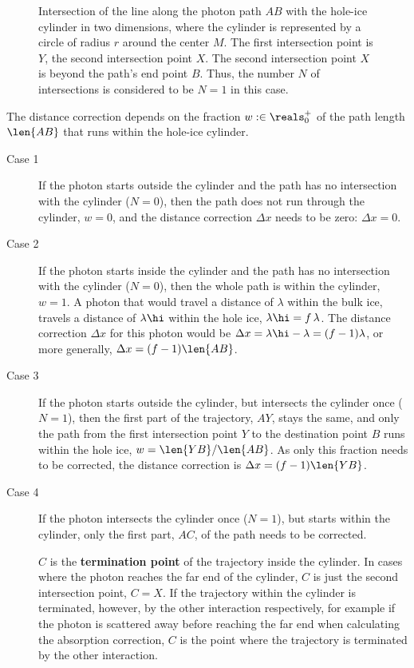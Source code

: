 \begin{figure}[htbp]
  \caption{Intersection of the line along the photon path $AB$ with the hole-ice cylinder in two dimensions, where the cylinder is represented by a circle of radius $r$ around the center $M$. The first intersection point is $Y$, the second intersection point $X$. The second intersection point $X$ is beyond the path's end point $B$. Thus, the number $N$ of intersections is considered to be $N=1$ in this case.}
  \label{fig:iefai4iV}
\end{figure}

The distance correction depends on the fraction $w :\in \reals^+_0$ of the path length $\len{AB}$ that runs within the hole-ice cylinder.

\begin{description}
  \item[Case 1] If the photon starts outside the cylinder and the path has no intersection with the cylinder ($N = 0$), then the path does not run through the cylinder, $w = 0$, and the distance correction $\Delta x$ needs to be zero: $\Delta x = 0$.
  \item[Case 2] If the photon starts inside the cylinder and the path has no intersection with the cylinder ($N = 0$), then the whole path is within the cylinder, $w = 1$. A photon that would travel a distance of $\lambda$ within the bulk ice, travels a distance of $\lambda\hi$ within the hole ice, $\lambda\hi = f\,\lambda$. The distance correction $\Delta x$ for this photon would be $\Delta x = \lambda\hi - \lambda = (f - 1)\lambda$, or more generally, $\Delta x = (f - 1) \len{AB}$.
  \item[Case 3] If the photon starts outside the cylinder, but intersects the cylinder once ($N = 1$), then the first part of the trajectory, $AY$, stays the same, and only the path from the first intersection point $Y$ to the destination point $B$ runs within the hole ice, $w = \len{YB} / \len{AB}$. As only this fraction needs to be corrected, the distance correction is $\Delta x = (f - 1)\len{YB}$.
  \item[Case 4] If the photon intersects the cylinder once ($N = 1$), but starts within the cylinder, only the first part, $AC$, of the path needs to be corrected.

  $C$ is the \textbf{termination point} of the trajectory inside the cylinder. In cases where the photon reaches the far end of the cylinder, $C$ is just the second intersection point, $C = X$. If the trajectory within the cylinder is terminated, however, by the other interaction respectively, for example if the photon is scattered away before reaching the far end when calculating the absorption correction, $C$ is the point where the trajectory is terminated by the other interaction.


\end{description}
